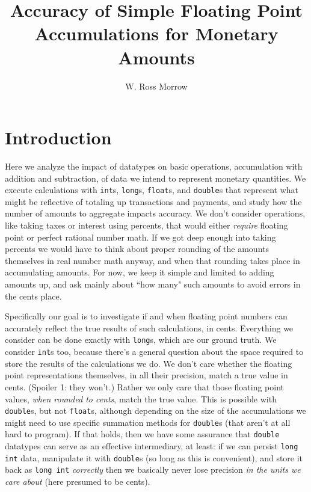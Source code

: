 \documentclass[11pt, oneside]{amsart}   	%
\title{Accuracy of Simple Floating Point Accumulations for Monetary Amounts}
\author{W. Ross Morrow}
\date{}							%
\begin{document}
\maketitle

\section{Introduction}

Here we analyze the impact of datatypes on basic operations, accumulation with addition and subtraction, of data we intend to represent monetary quantities. We execute calculations with \texttt{int}s, \texttt{long}s, \texttt{float}s, and \texttt{double}s that represent what might be reflective of totaling up transactions and payments, and study how the number of amounts to aggregate impacts accuracy. We don't consider operations, like taking taxes or interest using percents, that would either {\em require} floating point or perfect rational number math. If we got deep enough into taking percents we would have to think about proper rounding of the amounts themselves in real number math anyway, and when that rounding takes place in accumulating amounts. For now, we keep it simple and limited to adding amounts up, and ask mainly about ``how many" such amounts to avoid errors in the cents place.  

Specifically our goal is to investigate if and when floating point numbers can accurately reflect the true results of such calculations, in cents. Everything we consider can be done exactly with \texttt{long}s, which are our ground truth. We consider \texttt{int}s too, because there's a general question about the space required to store the results of the calculations we do. We don't care whether the floating point representations themselves, in all their precision, match a true value in cents. (Spoiler 1: they won't.) Rather we only care that those floating point values, {\em when rounded to cents}, match the true value. This is possible with \texttt{double}s, but not \texttt{float}s, although depending on the size of the accumulations we might need to use specific summation methods for \texttt{double}s (that aren't at all hard to program). If that holds, then we have some assurance that \texttt{double} datatypes can serve as an effective intermediary, at least: if we can persist \texttt{long int} data, manipulate it with \texttt{double}s (so long as this is convenient), and store it back as \texttt{long int} {\em correctly} then we basically never lose precision {\em in the units we care about} (here presumed to be cents). 
\end{document}
